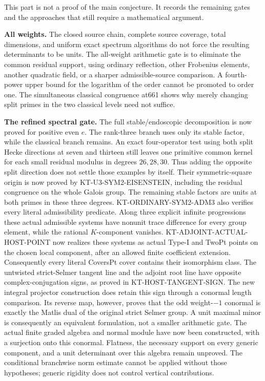 \documentclass[11pt,a4paper]{article}
\theoremstyle{definition}
\renewcommand{\paragraph}[1]{\par\smallskip\noindent\textbf{#1}\quad\ignorespaces}
\begin{document}
This part is not a proof of the main conjecture. It records the
remaining gates and the approaches that still require a
mathematical argument.

\paragraph{All weights.}
The closed source chain, complete source coverage, total
dimensions, and uniform exact spectrum algorithms do not
force the resulting determinants to be units. The all-weight
arithmetic gate is to eliminate the common residual support,
using ordinary reflection, other Frobenius elements, another
quadratic field, or a sharper admissible-source comparison.
A fourth-power upper bound for the logarithm of the order
cannot be promoted to order one. The simultaneous classical
congruence at661 shows why merely changing split primes in
the two classical levels need not suffice.

\paragraph{The refined spectral gate.}
The full stable/endoscopic decomposition is now proved for positive
even $e$. The rank-three branch uses only its stable factor, while
the classical branch remains. An exact four-operator test using
both split Hecke directions at seven and thirteen still leaves
one primitive common kernel for each small residual modulus in
degrees $26,28,30$. Thus adding the opposite split direction does
not settle those examples by itself. Their symmetric-square
origin is now proved by KT-U3-SYM2-EISENSTEIN, including the
residual congruence on the whole Galois group. The remaining
stable factors are units at both primes in these three degrees.
KT-ORDINARY-SYM2-ADM3 also verifies every literal admissibility
predicate. Along three explicit infinite progressions these
actual admissible systems have nonunit trace difference for
every group element, while the rational $K$-component vanishes.
KT-ADJOINT-ACTUAL-HOST-POINT now realizes these systems as
actual Type-I and TwoPt points on the chosen local component,
after an allowed finite coefficient extension. Consequently
every literal CoversPt cover contains their isomorphism class.
The untwisted strict-Selmer tangent line and the adjoint root
line have opposite complex-conjugation signs, as proved in
KT-HOST-TANGENT-SIGN. The new integral projector construction
does retain this sign through a conormal length comparison.
Its reverse map, however, proves that the odd weight-$-1$
conormal is exactly the Matlis dual of the original strict
Selmer group. A unit maximal minor is consequently an
equivalent formulation, not a smaller arithmetic gate.
The actual finite graded algebra and normal module have now
been constructed, with a surjection onto this conormal.
Flatness, the necessary support on every generic component,
and a unit determinant over this algebra remain unproved.
The conditional branchwise norm estimate cannot be applied
without those hypotheses; generic rigidity does not control
vertical contributions.
\end{document}
